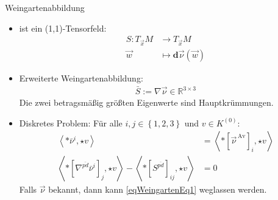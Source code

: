 \documentclass{beamer}
\newcommand{\R}{\mathds{R}}
\newcommand{\exd}{\mathbf{d}}
\newcommand{\vecover}[2]{\vec{#1}^{\,#2}}
\newcommand{\av}{\text{Av}}
\begin{document}
  \begin{frame}
    \begin{block}{Weingartenabbildung}
      \begin{itemize}
        \item<1-> ist ein (1,1)-Tensorfeld:
          \begin{align*}
            S: T_{\vec{x}}M &\rightarrow T_{\vec{x}}M \\
                    \vec{w} &\mapsto \exd\vec{\nu} \left( \vec{w} \right)
          \end{align*}
        \item<2-> Erweiterte Weingartenabbildung:
          \begin{align*}
            \bar{S}:= \nabla\vec{\nu} \in \R^{3 \times 3}
          \end{align*}
          Die zwei betragsmäßig größten Eigenwerte sind Hauptkrümmungen.
        \item<3-> Diskretes Problem: Für alle \( i,j\in\left\{ 1,2,3 \right\} \) und \( v\in K^{(0)} \):
          \begin{align}
            \label{eqWeingartenEq1}
        \left\langle *\bar{\nu}^{i} , \star v \right\rangle 
                &= \left\langle *\left[ \vecover{\nu}{\av} \right]_{i}, \star v \right\rangle \\
        \label{eqWeingartenEq2}
        \left\langle *\left[ \nabla^{\overline{pd}}\bar{\nu}^{i} \right]_{j} , \star v \right\rangle
            - \left\langle *\left[ S^{\overline{pd}} \right]_{ij} , \star v \right\rangle 
                &= 0
          \end{align}
         Falls \( \vec{\nu} \) bekannt, dann kann \eqref{eqWeingartenEq1} weglassen werden.
      \end{itemize}
    \end{block}
  \end{frame}
\end{document}

